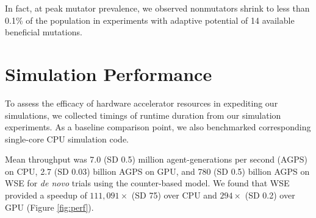 % 
In fact, at peak mutator prevalence, we observed nonmutators shrink to less than 0.1\% of the population in experiments with adaptive potential of 14 available beneficial mutations.

\section{Simulation Performance}
\label{sec:performance}



To assess the efficacy of hardware accelerator resources in expediting our simulations, we collected timings of runtime duration from our simulation experiments.
As a baseline comparison point, we also benchmarked corresponding single-core CPU simulation code.

Mean throughput was 7.0 (SD 0.5) million agent-generations per second (AGPS) on CPU, 2.7 (SD 0.03) billion AGPS on GPU, and 780 (SD 0.5) billion AGPS on WSE for \textit{de novo} trials using the counter-based model.
We found that WSE provided a speedup of $111,091\times$ (SD 75) over CPU and $294\times$ (SD 0.2) over GPU (Figure \ref{fig:perf}).

